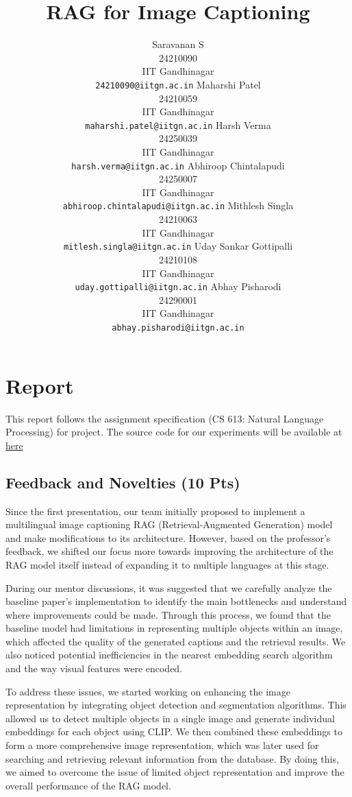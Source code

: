 \documentclass[11pt]{article}
\title{RAG for Image Captioning}
\author{Saravanan S \\ 24210090 \\ IIT Gandhinagar \\
  \texttt{24210090@iitgn.ac.in}
  \And
  Maharshi Patel \\ 24210059 \\ IIT Gandhinagar \\
  \texttt{maharshi.patel@iitgn.ac.in}
  \And
  Harsh Verma \\ 24250039 \\ IIT Gandhinagar \\
  \texttt{harsh.verma@iitgn.ac.in}
  \AND
  Abhiroop Chintalapudi \\ 24250007 \\ IIT Gandhinagar \\
  \texttt{abhiroop.chintalapudi@iitgn.ac.in}
  \And
  Mithlesh Singla \\ 24210063 \\ IIT Gandhinagar \\
  \texttt{mitlesh.singla@iitgn.ac.in}
  \AND
  Uday Sankar Gottipalli \\ 24210108 \\ IIT Gandhinagar \\
  \texttt{uday.gottipalli@iitgn.ac.in}
  \And
  Abhay Pisharodi \\ 24290001 \\ IIT Gandhinagar \\
  \texttt{abhay.pisharodi@iitgn.ac.in}
}
\begin{document}
\maketitle

\section{Report}
\label{sec:report}

This report follows the assignment specification (CS 613: Natural Language Processing) for project. The source code for our experiments will be available at \href{https://github.com/shadowscythe03/RAG_Image_Captioning}{here}

\subsection{Feedback and Novelties (10 Pts)}
Since the first presentation, our team initially proposed to implement a multilingual image captioning RAG (Retrieval-Augmented Generation) model and make modifications to its architecture. However, based on the professor's feedback, we shifted our focus more towards improving the architecture of the RAG model itself instead of expanding it to multiple languages at this stage.

During our mentor discussions, it was suggested that we carefully analyze the baseline paper's implementation to identify the main bottlenecks and understand where improvements could be made. Through this process, we found that the baseline model had limitations in representing multiple objects within an image, which affected the quality of the generated captions and the retrieval results. We also noticed potential inefficiencies in the nearest embedding search algorithm and the way visual features were encoded.

To address these issues, we started working on enhancing the image representation by integrating object detection and segmentation algorithms. This allowed us to detect multiple objects in a single image and generate individual embeddings for each object using CLIP. We then combined these embeddings to form a more comprehensive image representation, which was later used for searching and retrieving relevant information from the database. By doing this, we aimed to overcome the issue of limited object representation and improve the overall performance of the RAG model.
\end{document}
